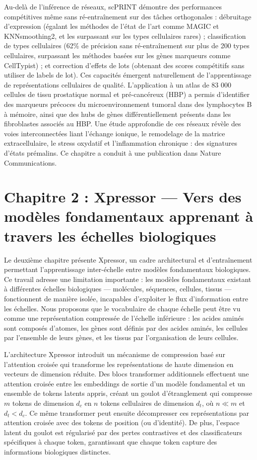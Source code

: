 Au-delà de l'inférence de réseaux, scPRINT démontre des performances compétitives même sans ré-entraînement sur des tâches orthogonales : débruitage d'expression (égalant les méthodes de l'état de l'art comme MAGIC et KNNsmoothing2, et les surpassant sur les types cellulaires rares) ; classification de types cellulaires (62\% de précision sans ré-entraînement sur plus de 200 types cellulaires, surpassant les méthodes basées sur les gènes marqueurs comme CellTypist) ; et correction d'effets de lots (obtenant des scores compétitifs sans utiliser de labels de lot). Ces capacités émergent naturellement de l'apprentissage de représentations cellulaires de qualité. L'application à un atlas de 83 000 cellules de tissu prostatique normal et pré-cancéreux (HBP) a permis d'identifier des marqueurs précoces du microenvironnement tumoral dans des lymphocytes B à mémoire, ainsi que des hubs de gènes différentiellement présents dans les fibroblastes associés au HBP. Une étude approfondie de ces réseaux révèle des voies interconnectées liant l'échange ionique, le remodelage de la matrice extracellulaire, le stress oxydatif et l'inflammation chronique : des signatures d'états prémalins. Ce chapitre a conduit à une publication dans Nature Communications.

\section*{Chapitre 2 : Xpressor — Vers des modèles fondamentaux apprenant à travers les échelles biologiques}

Le deuxième chapitre présente Xpressor, un cadre architectural et d'entraînement permettant l'apprentissage inter-échelle entre modèles fondamentaux biologiques. Ce travail adresse une limitation importante : les modèles fondamentaux existant à différentes échelles biologiques — molécules, séquences, cellules, tissus — fonctionnent de manière isolée, incapables d'exploiter le flux d'information entre les échelles. Nous proposons que le vocabulaire de chaque échelle peut être vu comme une représentation compressée de l'échelle inférieure : les acides aminés sont composés d'atomes, les gènes sont définis par des acides aminés, les cellules par l'ensemble de leurs gènes, et les tissus par l'organisation de leurs cellules.

L'architecture Xpressor introduit un mécanisme de compression basé sur l'attention croisée qui transforme les représentations de haute dimension en vecteurs de dimension réduite. Des blocs transformer additionnels effectuent une attention croisée entre les embeddings de sortie d'un modèle fondamental et un ensemble de tokens latents appris, créant un goulot d'étranglement qui compresse $m$ tokens de dimension $d_c$ en $n$ tokens cellulaires de dimension $d_t$, où $n \ll m$ et $d_t < d_c$. Ce même transformer peut ensuite décompresser ces représentations par attention croisée avec des tokens de position (ou d'identité). De plus, l'espace latent du goulot est régularisé par des pertes contrastives et des classificateurs spécifiques à chaque token, garantissant que chaque token capture des informations biologiques distinctes.

